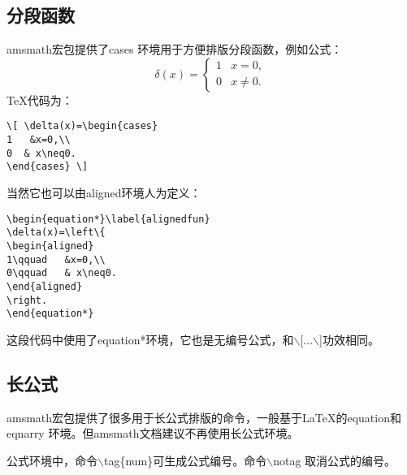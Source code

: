 \subsection{分段函数}
amsmath宏包提供了cases 环境用于方便排版分段函数，例如公式：
\[ \delta(x)=\begin{cases}
1   &x=0,\\
0  & x\neq0.
\end{cases} \]\TeX{}代码为：
\begin{lstlisting}
\[ \delta(x)=\begin{cases}
1   &x=0,\\
0  & x\neq0.
\end{cases} \]
\end{lstlisting}
当然它也可以由aligned环境人为定义：
\begin{lstlisting}
\begin{equation*}\label{alignedfun}
\delta(x)=\left\{
\begin{aligned}
1\qquad   &x=0,\\
0\qquad   & x\neq0.	
\end{aligned}
\right.
\end{equation*}
\end{lstlisting}
这段代码中使用了equation*环境，它也是无编号公式，和$\backslash$[...$\backslash$]功效相同。

\subsection{长公式}
amsmath宏包提供了很多用于长公式排版的命令，一般基于\LaTeX 的equation和eqnarry 环境。但amsmath文档建议不再使用长公式环境。

公式环境中，命令$\backslash$tag\{num\}可生成公式编号。命令$\backslash$notag 取消公式的编号。

